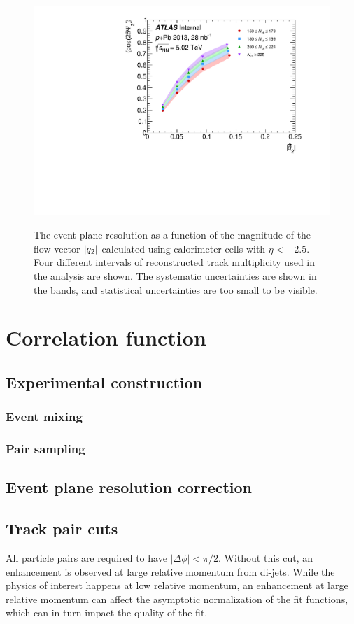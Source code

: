 \begin{figure}[t]
\centering
\includegraphics{epRes.pdf}\\
\caption{The event plane resolution as a function of the magnitude of the flow vector $|q_{2}|$ calculated using calorimeter cells with $\eta < -2.5$. Four different intervals of reconstructed track multiplicity \Nch used in the analysis are shown. The systematic uncertainties are shown in the bands, and statistical uncertainties are too small to be visible.}
\label{fig:ep_res}
\end{figure}


\section{Correlation function}

\subsection{Experimental construction}
\subsubsection{Event mixing}
\subsubsection{Pair sampling}
\subsection{Event plane resolution correction}

\subsection{Track pair cuts}
All particle pairs are required to have $\left| \Delta \phi \right| < \pi/2$.
Without this cut, an enhancement is observed at large relative momentum from di-jets.
While the physics of interest happens at low relative momentum, an enhancement at large relative momentum can affect the asymptotic normalization of the fit functions, which can in turn impact the quality of the fit.

